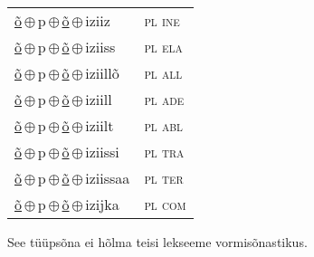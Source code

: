 \begin{minipage}{\textwidth}
\begin{sideways}
\begin{tabular}{l l}
\underline{õ}\,$\oplus$\,p\,$\oplus$\,\underline{õ}\,$\oplus$\,iziiz & \textsc{ pl ine } \\
\underline{õ}\,$\oplus$\,p\,$\oplus$\,\underline{õ}\,$\oplus$\,iziiss & \textsc{ pl ela } \\
\underline{õ}\,$\oplus$\,p\,$\oplus$\,\underline{õ}\,$\oplus$\,iziillõ & \textsc{ pl all } \\
\underline{õ}\,$\oplus$\,p\,$\oplus$\,\underline{õ}\,$\oplus$\,iziill & \textsc{ pl ade } \\
\underline{õ}\,$\oplus$\,p\,$\oplus$\,\underline{õ}\,$\oplus$\,iziilt & \textsc{ pl abl } \\
\underline{õ}\,$\oplus$\,p\,$\oplus$\,\underline{õ}\,$\oplus$\,iziissi & \textsc{ pl tra } \\
\underline{õ}\,$\oplus$\,p\,$\oplus$\,\underline{õ}\,$\oplus$\,iziissaa & \textsc{ pl ter } \\
\underline{õ}\,$\oplus$\,p\,$\oplus$\,\underline{õ}\,$\oplus$\,izijka & \textsc{ pl com } \\
\end{tabular}
\end{sideways}
\label{tab:tüüpsõnamall-õpõin}

\end{minipage}

 
\vspace{1em}
\noindent See tüüpsõna ei hõlma teisi lekseeme vormi\-sõnastikus.
